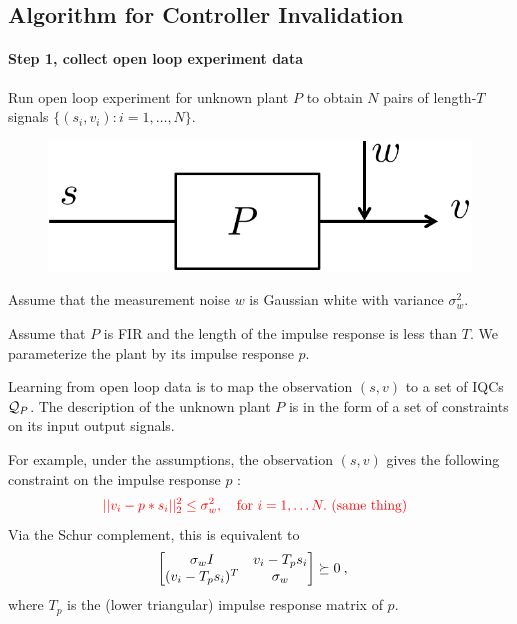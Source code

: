 \documentclass[11pt, onecolumn]{article}
\newcommand{\rb}[1]{{\color{red}{ #1}}}
\begin{document}
\subsection{Algorithm for Controller Invalidation}

\paragraph{Step 1,  collect open loop experiment data}
Run open loop experiment for unknown plant $P$ to obtain $N$ pairs of length-$T$ signals $\{(s_i,v_i) :
i=1,\dots, N\}$.
\begin{figure}[!ht]
  \centering
  \includegraphics[width=.3\linewidth]{sys3.pdf}
\end{figure}

\begin{assumption}
  Assume that the measurement noise $w$ is Gaussian white with variance $\sigma_w^2$.
\end{assumption}

\begin{assumption}
  Assume that $P$ is FIR and the length of the impulse response is less than $T$. We parameterize
  the plant by its impulse response $p$.
\end{assumption}


\begin{definition}
  Learning from open loop data is to map the observation $(s,v)$ to a set of IQCs $\mathcal Q_P$.  The
  description of the unknown plant $P$ is in the form of a set of constraints on its input output
  signals.


  For example, under the assumptions, the observation $(s,v)$ gives the following constraint on the
  impulse response $p$ \rb{Doesn't this only hold in expectation/WHP? The constraint is fine, but it doesn't ``follow from the assumption''.}:
  \begin{align*}
    &\; \rb{||v_i - p*s_i||_2^2 \leq \sigma_w^2, \quad \tx{for }i= 1,\dots N. \tx{ (same thing)}}
  \end{align*}
  Via the Schur complement, this is equivalent to
  \begin{align*}
  \begin{bmatrix}\sigma_wI & v_i - T_ps_i \\ (v_i - T_ps_i)^T & \sigma_w\end{bmatrix} \succeq &\; 0\:,
  \end{align*}
  where $T_p$ is the (lower triangular) impulse response matrix of $p$.
  \rb{Need to figure out how to efficiently write this as constraints on the inputs and outputs of $P$}

\end{definition}
\end{document}

